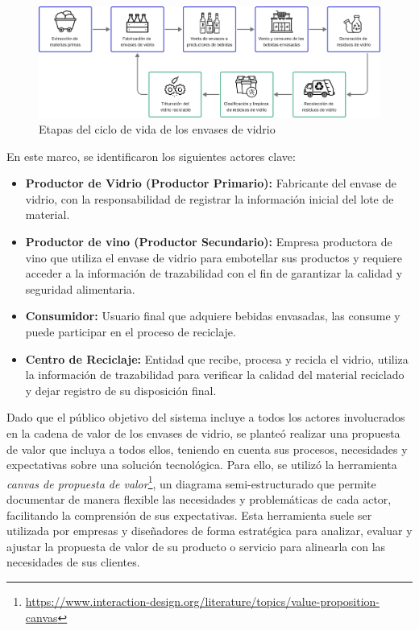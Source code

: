 \begin{figure}[!htb]
    \centering
    \includegraphics[width=\linewidth]{Figures/glass-lifecycle.png}
    \caption{Etapas del ciclo de vida de los envases de vidrio}
    \label{fig:glass-lifecycle-modelling}
\end{figure}

En este marco, se identificaron los siguientes actores clave:

\begin{itemize}
    \item \textbf{Productor de Vidrio (Productor Primario):} Fabricante del envase de vidrio, con la responsabilidad de registrar la información inicial del lote de material.
    \item \textbf{Productor de vino (Productor Secundario):} Empresa productora de vino que utiliza el envase de vidrio para embotellar sus productos y requiere acceder a la información de trazabilidad con el fin de garantizar la calidad y seguridad alimentaria.
    \item \textbf{Consumidor:} Usuario final que adquiere bebidas envasadas, las consume y puede participar en el proceso de reciclaje.
    \item \textbf{Centro de Reciclaje:} Entidad que recibe, procesa y recicla el vidrio, utiliza la información de trazabilidad para verificar la calidad del material reciclado y dejar registro de su disposición final.
\end{itemize}

Dado que el público objetivo del sistema incluye a todos los actores involucrados en la cadena de valor de los envases de vidrio, se planteó realizar una propuesta de valor que incluya a todos ellos, teniendo en cuenta sus procesos, necesidades y expectativas sobre una solución tecnológica. Para ello, se utilizó la herramienta \textit{canvas de propuesta de valor}\footnote{\url{https://www.interaction-design.org/literature/topics/value-proposition-canvas}}, un diagrama semi-estructurado que permite documentar de manera flexible las necesidades y problemáticas de cada actor, facilitando la comprensión de sus expectativas. Esta herramienta suele ser utilizada por empresas y diseñadores de forma estratégica para analizar, evaluar y ajustar la propuesta de valor de su producto o servicio para alinearla con las necesidades de sus clientes.

